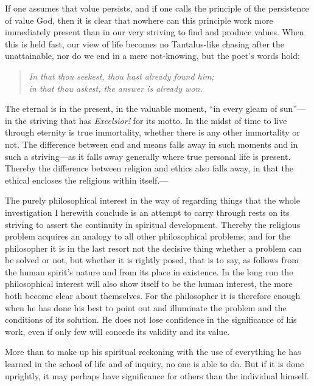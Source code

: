 \documentclass[12pt,a4paper]{book}
\newcommand{\opage}[1]{\marginnote{\footnotesize\textit{[#1]}}}
\begin{document}
If one assumes that value persists, and if one calls the principle of the persistence of value God, then it is
clear that nowhere can this principle work more immediately present than in our very striving to find and
produce values. When this is held fast, our view of life becomes no Tantalus-like chasing after the
unattainable, nor do we end in a mere not-knowing, but the poet's words hold:

\begin{quote}
\textit{In that thou seekest, thou hast already found him;}\\
\textit{in that thou askest, the answer is already won.}
\end{quote}

The eternal is in the present, in the valuable moment, ``in every gleam of sun''---in the striving that has
\textit{Excelsior!} for 
\opage{244}its motto. In the midst of time to live through eternity is true immortality, whether
there is any other immortality or not. The difference between end and means falls away in such moments and in
such a striving---as it falls away generally where true personal life is present. Thereby the difference between
religion and ethics also falls away, in that the ethical encloses the religious within itself.---

The purely philosophical interest in the way of regarding things that the whole investigation I herewith conclude
is an attempt to carry through rests on its striving to assert the continuity in spiritual development. Thereby
the religious problem acquires an analogy to all other philosophical problems; and for the philosopher it is in
the last resort not the decisive thing whether a problem can be solved or not, but whether it is rightly posed,
that is to say, as follows from the human spirit's nature and from its place in existence. In the long run the
philosophical interest will also show itself to be the human interest, the more both become clear about
themselves. For the philosopher it is therefore enough when he has done his best to point out and illuminate the
problem and the conditions of its solution. He does not lose confidence in the significance of his work, even if
only few will concede its validity and its value.

More than to make up his spiritual reckoning with the use of everything he has learned in the school of life and
of inquiry, no one is able to do. But if it is done uprightly, it may perhaps have significance for others than
the individual himself.
\end{document}
